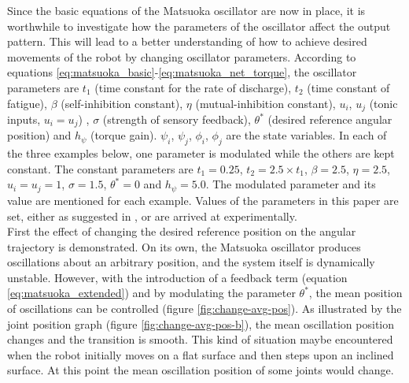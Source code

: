 \documentclass[12pt,twoside]{article}
\theoremstyle{plain}
\theoremstyle{definition}
\theoremstyle{remark}
\newcommand{\forceindent}{\leavevmode{\parindent=2em\indent}}
\begin{document}
\forceindent Since the basic equations of the Matsuoka oscillator are now in place, it is worthwhile to investigate how the parameters of the oscillator affect the output pattern. This will lead to a better understanding of how to achieve desired movements of the robot by changing oscillator parameters. According to equations \ref{eq:matsuoka_basic}-\ref{eq:matsuoka_net_torque}, the oscillator parameters are $t_1$ (time constant for the rate of discharge), $t_2$ (time constant of fatigue), $\beta$ (self-inhibition constant), $\eta$ (mutual-inhibition constant), $u_i$, $u_j$ (tonic inputs, $u_i=u_j$) , $\sigma$ (strength of sensory feedback),  $\theta^*$ (desired reference angular position) and $h_{\psi}$ (torque gain). $\psi_i$, $\psi_j$, $\phi_i$, $\phi_j$ are the state variables. In each of the three examples below, one parameter is modulated while the others are kept constant. The constant parameters are $t_1=0.25$, $t_2= 2.5 \times t_1$, $\beta=2.5$,  $\eta=2.5$, $u_i=u_j=1$, $\sigma=1.5$, $\theta^*=0$ and $h_{\psi}=5.0$. The modulated parameter and its value are mentioned for each example. Values of the parameters  in this paper are set, either as suggested in \cite{Ronsse2009}, or are arrived at experimentally. \\ 
\forceindent First the effect of changing the desired reference position on the angular trajectory is demonstrated. On its own, the Matsuoka oscillator produces oscillations about an arbitrary position, and the system itself is dynamically unstable. However, with the introduction of a feedback term (equation \ref{eq:matsuoka_extended}) and by modulating the parameter $\theta^*$, the mean position of oscillations can be controlled \cite{Ronsse2009} (figure \ref{fig:change-avg-pos}). As illustrated by the joint position graph (figure \ref{fig:change-avg-pos-b}), the mean oscillation position changes and the transition is smooth.  This kind of situation maybe encountered when the robot initially moves on a flat surface and then steps upon an inclined surface. At this point the mean oscillation position of some joints would change.\\
\end{document}
